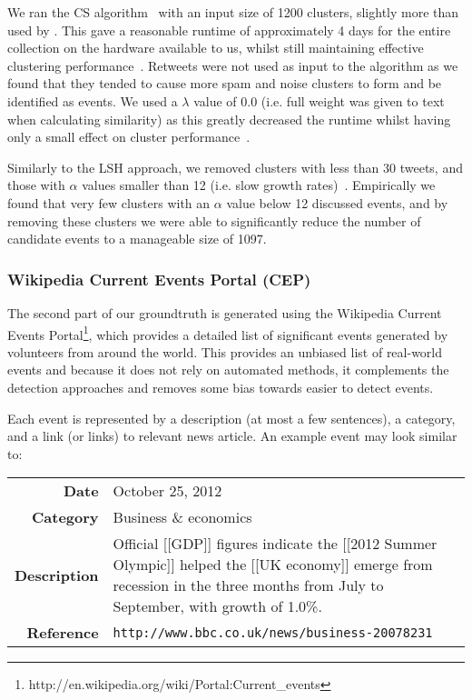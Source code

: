 We ran the CS algorithm~\citep{aggarwalevent} with an input size of 1200 clusters, slightly more than used by \cite{aggarwalevent}. This gave a reasonable runtime of approximately 4 days for the entire collection on the hardware available to us, whilst still maintaining effective clustering performance~\citep{aggarwalevent}.
Retweets were not used as input to the algorithm as we found that they tended to cause more spam and noise clusters to form and be identified as events.
We used a \(\lambda\) value of 0.0 (i.e. full weight was given to text when calculating similarity) as this greatly decreased the runtime whilst having only a small effect on cluster performance~\citep{aggarwalevent}.

Similarly to the LSH approach, we removed clusters with less than 30 tweets, and those with \(\alpha\) values smaller than 12  (i.e. slow growth rates)~\citep{aggarwalevent}.
Empirically we found that very few clusters with an \(\alpha\) value below 12 discussed events, and by removing these clusters we were able to significantly reduce the number of candidate events to a manageable size of 1097.


\subsubsection{Wikipedia Current Events Portal (CEP)}
The second part of our groundtruth is generated using the Wikipedia Current Events Portal\footnote{http://en.wikipedia.org/wiki/Portal:Current\_events}, which provides a detailed list of significant events generated by volunteers from around the world.
This provides an unbiased list of real-world events and because it does not rely on automated methods, it complements the detection approaches and removes some bias towards easier to detect events.

Each event is represented by a description (at most a few sentences), a category, and a link (or links) to relevant news article.
An example event may look similar to:

{
\begin{tabulary}{\textwidth}{r L}
\textbf{Date} & October 25, 2012\\
\textbf{Category} & Business \& economics\\
\textbf{Description} & Official [[GDP]] figures indicate the [[2012 Summer Olympic]] helped the [[UK economy]] emerge from recession in the three months from July to September, with growth of 1.0\%. \\
\textbf{Reference} & \texttt{http://www.bbc.co.uk/news/business-20078231}\\
\end{tabulary}
}

